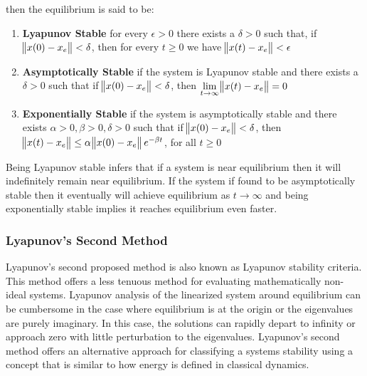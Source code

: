 then the equilibrium is said to be:
\begin{enumerate}
	\item \textbf{Lyapunov Stable} \newline
	for every $\epsilon > 0$ there exists a $\delta > 0$ such that, if \: $\norm{x(0) - x_e} < \delta$, then for every $t \geq 0$ we have 	$ \norm{x(t) - x_e} < \epsilon$	
	\item \textbf{Asymptotically Stable} \newline
	if the system is Lyapunov stable and there exists a $\delta > 0$ such that if \: $\norm{x(0) - x_e}  < \delta$, then $\displaystyle \lim_{t\to \infty} \norm{x(t)-x_e} =0$
	\item \textbf{Exponentially Stable} \newline
	if the system is asymptotically stable and there exists $\alpha > 0, \beta > 0, \delta > 0$ such that if $\norm{x(0)-x_e}<\delta$, then \:$\norm{x(t)-x_e} \leq \alpha \norm{x(0)-x_e} e^{-\beta t}$, for all $t \geq 0$
\end{enumerate}

Being Lyapunov stable infers that if a system is near equilibrium then it will indefinitely remain near equilibrium.  If the system if found to be asymptotically stable then it eventually will achieve equilibrium as $t\to \infty$ and being exponentially stable implies it reaches equilibrium even faster.

\subsubsection{Lyapunov's Second Method}
 
Lyapunov's second proposed method is also known as Lyapunov stability criteria.  This method offers a less tenuous method for evaluating mathematically non-ideal systems.  Lyapunov analysis of the linearized system around equilibrium can be cumbersome in the case where equilibrium is at the origin or the eigenvalues are purely imaginary.  In this case, the solutions can rapidly depart to infinity or approach zero with little perturbation to the eigenvalues.  Lyapunov's second method offers an alternative approach for classifying a systems stability using a concept that is similar to how energy is defined in classical dynamics.

